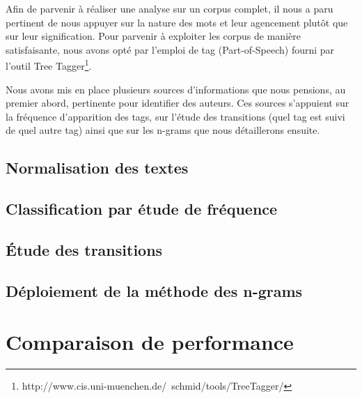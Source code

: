 \documentclass[a4paper]{article}
\begin{document}
Afin de parvenir à réaliser une analyse sur un corpus complet, il nous a paru pertinent de nous appuyer sur la nature des mots et leur agencement plutôt que sur leur signification. Pour parvenir à exploiter les corpus de manière satisfaisante, nous avons opté par l'emploi de tag (Part-of-Speech) fourni par l'outil Tree Tagger\footnote{http://www.cis.uni-muenchen.de/~schmid/tools/TreeTagger/}.

Nous avons mis en place plusieurs sources d'informations que nous pensions, au premier abord, pertinente pour identifier des auteurs. Ces sources s’appuient sur la fréquence d'apparition des tags, sur l'étude des transitions (quel tag est suivi de quel autre tag) ainsi que sur les n-grams que nous détaillerons ensuite.

\subsection{Normalisation des textes}

\subsection{Classification par étude de fréquence}

\subsection{Étude des transitions}

\subsection{Déploiement de la méthode des n-grams}

\section{Comparaison de performance}
\end{document}
